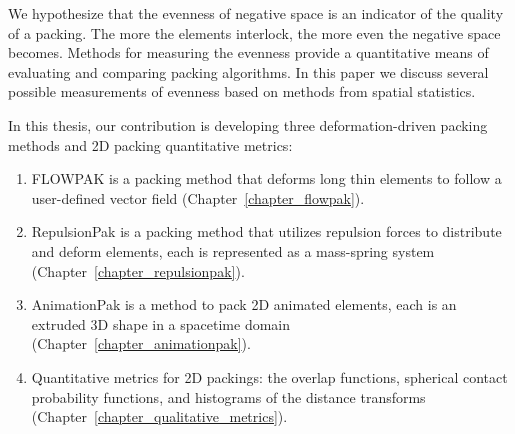 We hypothesize that the evenness of negative space is an indicator of the quality of a packing.
The more the elements interlock, the more even the negative space becomes.
Methods for measuring the evenness provide a quantitative means of evaluating
and comparing packing algorithms.  In this paper we discuss
several possible measurements of evenness based on methods from
spatial statistics.

In this thesis, our contribution is developing three deformation-driven packing methods and 2D packing quantitative metrics:
\begin{enumerate}
\item FLOWPAK is a packing method that deforms long thin elements to follow a user-defined vector field (Chapter~\ref{chapter_flowpak}).
\item RepulsionPak is a packing method that utilizes repulsion forces to distribute and deform elements,
	each is represented as a mass-spring system (Chapter~\ref{chapter_repulsionpak}).
\item AnimationPak is a method to pack 2D animated elements, each is an extruded 3D shape
	in a spacetime domain (Chapter~\ref{chapter_animationpak}). 
\item  Quantitative metrics for 2D packings: the overlap functions, spherical contact probability functions,
and histograms of the distance transforms (Chapter~\ref{chapter_qualitative_metrics}). 
\end{enumerate}







